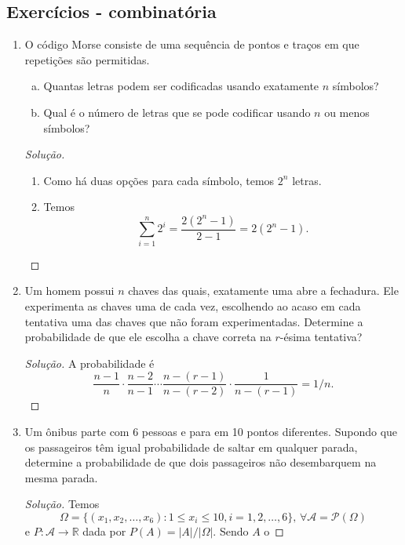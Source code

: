\documentclass[../Notas.tex]{subfiles}
\begin{document}
\subsection{Exercícios - combinatória}

\begin{enumerate}
    \item O código Morse consiste de uma sequência de pontos e traços em que repetições são permitidas.
    \begin{enumerate}[a)]
    \item Quantas letras podem ser codificadas usando exatamente $n$ símbolos?
    \item Qual é o número de letras que se pode codificar usando $n$ ou menos símbolos?
    \end{enumerate}
    \begin{proof}[Solução]
        \begin{enumerate}
            \item Como há duas opções para cada símbolo, temos $2^n$ letras.
            \item Temos
            \[
            \sum_{i=1}^n 2^i = \frac{2(2^n - 1)}{2 - 1} = 2(2^n - 1).
            \]
        \end{enumerate}
    \end{proof}
    \item Um homem possui $n$ chaves das quais, exatamente uma abre a fechadura. Ele experimenta as chaves uma de cada vez, escolhendo ao acaso em cada tentativa uma das chaves que não foram experimentadas. Determine a probabilidade de que ele escolha a chave correta na $r$-ésima tentativa?
    \begin{proof}[Solução]
        A probabilidade é
        \[
        \frac{n-1}{n}\cdot\frac{n-2}{n-1}\cdots\frac{n-(r-1)}{n-(r-2)}\cdot\frac{1}{n-(r-1)} = 1/n.
        \]
    \end{proof}
    \item Um ônibus parte com 6 pessoas e para em 10 pontos diferentes. Supondo que os passageiros têm igual probabilidade de saltar em qualquer parada, determine a probabilidade de que dois passageiros não desembarquem na mesma parada.
    \begin{proof}[Solução]
        Temos
        \[
        \Omega = \{ (x_1, x_2, \dots, x_6) : 1\leq x_i\leq 10, i = 1,2,\dots,6 \},
        \, \forall \mathcal{A} = \mathcal{P}(\Omega)
        \]
        e $P:\mathcal{A}\to\mathbb{R}$ dada por $P(A) = |A|/|\Omega|$. Sendo $A$ o

\end{proof}
\end{enumerate}
\end{document}
